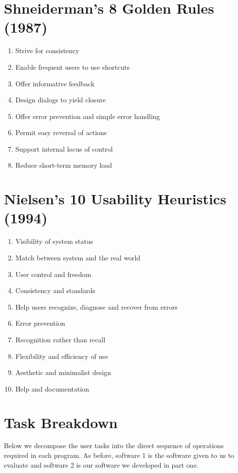 \documentclass[a4paper,11pt,oneside]{article}
\begin{document}
\section{Shneiderman’s 8 Golden Rules (1987)}
\label{sec:s_rules}
\begin{enumerate}
    \item Strive for consistency
    \item Enable frequent users to use shortcuts
    \item Offer informative feedback
    \item Design dialogs to yield closure
    \item Offer error prevention and simple error handling
    \item Permit easy reversal of actions
    \item Support internal locus of control
    \item Reduce short-term memory load 
\end{enumerate}

\section{Nielsen’s 10 Usability Heuristics (1994)}
\label{sec:n_rules}
\begin{enumerate}
    \item Visibility of system status
    \item Match between system and the real world
    \item User control and freedom
    \item Consistency and standards
    \item Help users recognize, diagnose and recover from errors
    \item Error prevention
    \item Recognition rather than recall
    \item Flexibility and efficiency of use
    \item Aesthetic and minimalist design
    \item Help and documentation
\end{enumerate}

\section{Task Breakdown}
\label{sec:task_breakdown}

Below we decompose the user tasks into the direct sequence of operations required in each program. As before, software 1 is the software given to us to evaluate and software 2 is our software we developed in part one.
\end{document}
